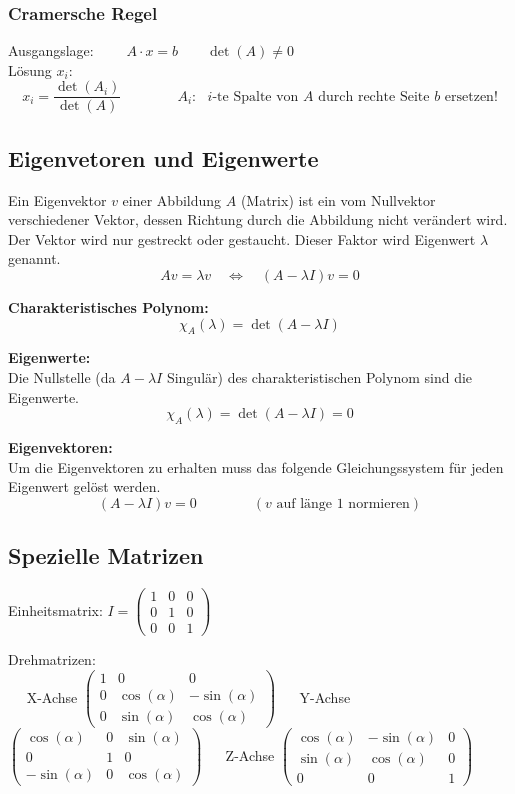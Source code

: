 \subsubsection{Cramersche Regel}
Ausgangslage: $\qquad A \cdot x = b \qquad \det(A)\neq 0$\\
Lösung $x_i$:
\[
	x_i=\frac{\det(A_i)}{\det(A)} \qquad \qquad A_i:\text{ $i$-te Spalte von $A$  durch rechte Seite  $b$ ersetzen!}
\]


\subsection{Eigenvetoren und Eigenwerte}
Ein Eigenvektor $v$ einer Abbildung $A$ (Matrix) ist ein vom Nullvektor
verschiedener Vektor, dessen Richtung durch die Abbildung nicht verändert wird. Der Vektor wird nur
gestreckt oder gestaucht. Dieser Faktor wird Eigenwert $\lambda$ genannt.
\[
	A v = \lambda v \quad \Leftrightarrow \quad (A-\lambda I)v=0
\]

\textbf{Charakteristisches Polynom:}\\
\[
	\chi_A(\lambda)=\det(A-\lambda I)
\]

\textbf{Eigenwerte:}\\
Die Nullstelle (da $A-\lambda I$ Singulär) des charakteristischen Polynom sind
die Eigenwerte. 
\[
	\chi_A(\lambda)=\det(A-\lambda I)=0
\]

\textbf{Eigenvektoren:}\\
Um die Eigenvektoren zu erhalten muss das folgende Gleichungssystem für jeden
Eigenwert gelöst werden.
\[ 
	(A-\lambda I)v=0 \qquad \qquad (v \text{ auf länge 1 normieren})
\]

\subsection{Spezielle Matrizen}
Einheitsmatrix: 
$I= \begin{pmatrix} 
1 & 0 & 0 \\
0 & 1 & 0 \\
0 & 0 & 1
\end{pmatrix}$

\vspace{0.5cm}

Drehmatrizen:
\\
$\quad$
X-Achse
$\begin{pmatrix} 
	1 & 0 & 0 \\
	0 & \cos(\alpha) & -\sin(\alpha) \\
	0 & \sin(\alpha) & \cos(\alpha)
\end{pmatrix}$
$\quad$
Y-Achse
$\begin{pmatrix} 
	\cos(\alpha) & 0 & \sin(\alpha) \\
	0 & 1 & 0 \\
	-\sin(\alpha) & 0 & \cos(\alpha)
\end{pmatrix}$
$\quad$
Z-Achse
$\begin{pmatrix} 
	\cos(\alpha) & -\sin(\alpha) & 0 \\
	\sin(\alpha) & \cos(\alpha) & 0 \\
	0 & 0 & 1
\end{pmatrix}$

